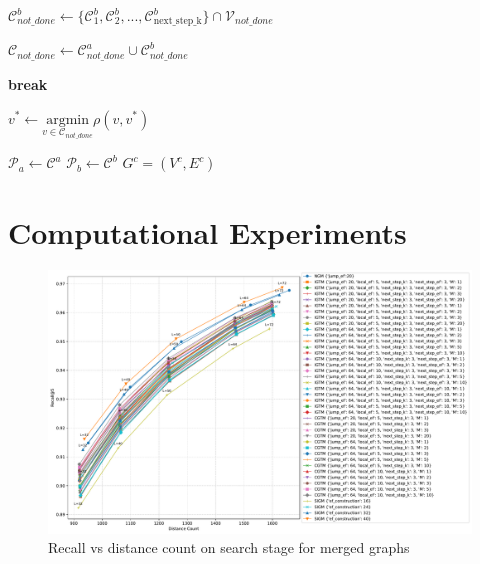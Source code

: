 \documentclass{article}
\begin{document}
\begin{algorithm}
\begin{algorithmic}[1]
        \State $\mathcal{C}^b_{not\_done} \gets \{\mathcal{C}^b_1, \mathcal{C}^b_2, ..., \mathcal{C}^b_{ \text{next\_step\_k} } \}  \cap \mathcal{V}_{not\_done}$
        
        
        \State $\mathcal{C}_{not\_done} \gets \mathcal{C}^a_{not\_done} \cup \mathcal{C}^b_{not\_done}$
        
            \State \textbf{break}
        \EndIf
        
        \State $v^* \gets \underset{v \in \mathcal{C}_{not\_done}}{\mathrm{argmin}} \rho(v, v^*)$
        
        \State $\mathcal{P}_a \gets \mathcal{C}^a$
        \State $\mathcal{P}_b \gets \mathcal{C}^b$
    \EndWhile
\EndWhile
\State \Return $G^c=(V^c,E^c)$
\end{algorithmic}
\end{algorithm}

\section{Computational Experiments}

\begin{figure}
  \centering
  \includegraphics[width=1.\linewidth]{figs/recall_vs_distance_count.pdf}
  \caption{Recall vs distance count on search stage for merged graphs}
\label{fig:search}
\end{figure}


\end{document}
